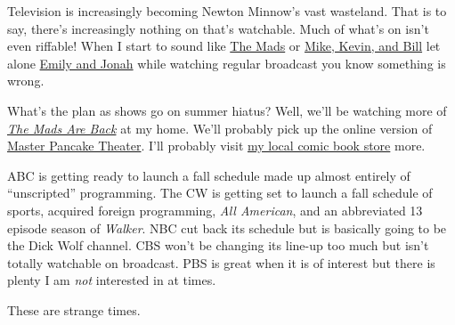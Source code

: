 Television is increasingly becoming Newton Minnow's vast wasteland. That
is to say, there's increasingly nothing on that's watchable. Much of
what's on isn't even riffable! When I start to sound like
\href{https://dumb-industries.com/shows/themadsareback}{The Mads} or
\href{https://www.rifftrax.com/about}{Mike, Kevin, and Bill} let alone
\href{https://www.gizmoplex.com/}{Emily and Jonah} while watching
regular broadcast you know something is wrong.

What's the plan as shows go on summer hiatus? Well, we'll be watching
more of
\href{https://dumb-industries.com/shows/themadsareback}{\emph{The Mads
Are Back}} at my home. We'll probably pick up the online version of
\href{https://drafthouse.com/series/master-pancake}{Master Pancake
Theater}. I'll probably visit \href{https://robot-zero.com}{my local
comic book store} more.

ABC is getting ready to launch a fall schedule made up almost entirely
of ``unscripted'' programming. The CW is getting set to launch a fall
schedule of sports, acquired foreign programming, \emph{All American},
and an abbreviated 13 episode season of \emph{Walker}. NBC cut back its
schedule but is basically going to be the Dick Wolf channel. CBS won't
be changing its line-up too much but isn't totally watchable on
broadcast. PBS is great when it is of interest but there is plenty I am
\emph{not} interested in at times.

These are strange times.
